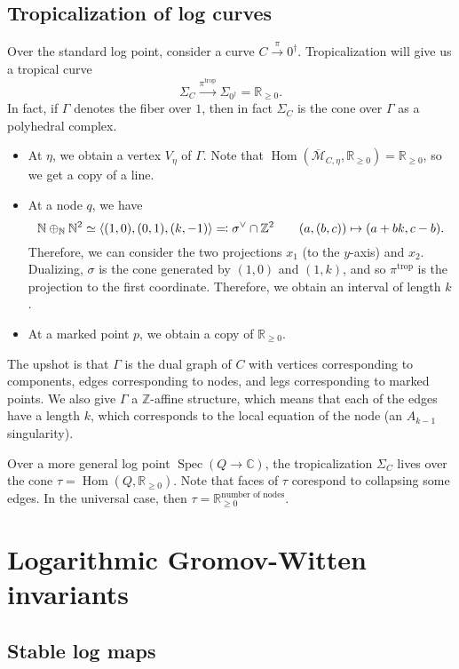 \documentclass[leqno, openany]{memoir}
\theoremstyle{definition}
\theoremstyle{remark}
\theoremstyle{plain}
\theoremstyle{definition}
\theoremstyle{remark}
\newcommand{\N}{\mathbb{N}}
\newcommand{\R}{\mathbb{R}}
\newcommand{\C}{\mathbb{C}}
\newcommand{\Z}{\mathbb{Z}}
\newcommand{\mc}[1]{\mathcal{#1}}
\newcommand{\mr}[1]{\mathrm{#1}}
\newcommand{\ol}[1]{\overline{#1}}
\DeclareMathOperator{\Hom}{Hom}
\DeclareMathOperator{\Spec}{Spec}
\begin{document}
\subsection{Tropicalization of log curves}
\label{subsec:tropicalization_2}

Over the standard log point, consider a curve $C \xrightarrow{\pi} 0^{\dag}$. Tropicalization will give us a tropical curve
\[ \Sigma_C \xrightarrow{\pi^{\mr{trop}}} \Sigma_{0^{\dag}} = \R_{\geq 0}. \]
In fact, if $\Gamma$ denotes the fiber over $1$, then in fact $\Sigma_C$ is the cone over $\Gamma$ as a polyhedral complex.
\begin{itemize}
\item At $\eta$, we obtain a vertex $V_{\eta}$ of $\Gamma$. Note that $\Hom(\ol{\mc{M}}_{C,\eta}, \R_{\geq 0}) = \R_{\geq 0}$, so we get a copy of a line.
\item At a node $q$, we have
  \[ \N \oplus_{\N} \N^2 \simeq \ev{(1,0), (0, 1), (k, -1)} \eqqcolon \sigma^{\vee} \cap \Z^2 \qquad (a, (b,c)) \mapsto (a+bk, c-b). \]
  Therefore, we can consider the two projections $x_1$ (to the $y$-axis) and $x_2$. Dualizing, $\sigma$ is the cone generated by $(1,0)$ and $(1,k)$, and so $\pi^{\mr{trop}}$ is the projection to the first coordinate. Therefore, we obtain an interval of length $k$.
\item At a marked point $p$, we obtain a copy of $\R_{\geq 0}$.
\end{itemize}
The upshot is that $\Gamma$ is the dual graph of $C$ with vertices corresponding to components, edges corresponding to nodes, and legs corresponding to marked points. We also give $\Gamma$ a $\Z$-affine structure, which means that each of the edges have a length $k$, which corresponds to the local equation of the node (an $A_{k-1}$ singularity).

Over a more general log point $\Spec(Q \to \C)$, the tropicalization $\Sigma_C$ lives over the cone $\tau = \Hom(Q, \R_{\geq 0})$. Note that faces of $\tau$ corespond to collapsing some edges. In the universal case, then $\tau = \R_{\geq 0}^{\text{number of nodes}}$.

\section{Logarithmic Gromov-Witten invariants}
\label{sec:log_gw}

\subsection{Stable log maps}
\label{subsec:stable_maps}
\end{document}

